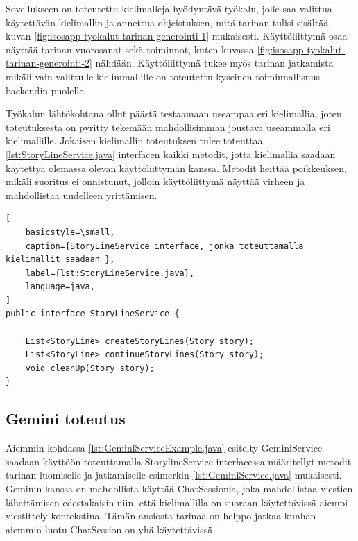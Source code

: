 Sovellukseen on toteutettu kielimalleja hyödyntävä työkalu, jolle saa valittua
käytettävän kielimallin ja annettua ohjeistuksen, mitä tarinan tulisi sisältää,
kuvan \ref{fig:isosapp-tyokalut-tarinan-generointi-1} mukaisesti.
Käyttöliittymä osaa näyttää tarinan vuorosanat sekä toiminnot, kuten kuvassa
\ref{fig:isosapp-tyokalut-tarinan-generointi-2} nähdään. Käyttöliittymä tukee
myös tarinan jatkamista mikäli vain valittulle kielimmallille on toteutettu
kyseinen toiminnallisuus backendin puolelle.

Työkalun lähtökohtana ollut päästä testaamaan useampaa eri kielimallia, joten
toteutuksesta on pyritty tekemään mahdollisimman joustava useammalla eri
kielimallille. Jokaisen kielimallin toteutuksen tulee toteuttaa
\ref{lst:StoryLineService.java} interfacen kaikki metodit, jotta kielimallia
saadaan käytettyä olemassa olevan käyttöliittymän kanssa. Metodit heittää
poikkeuksen, mikäli suoritus ei onnistunut, jolloin käyttöliittymä näyttää
virheen ja mahdollistaa uudelleen yrittämisen.

\clearpage
\begin{lstlisting}[
    basicstyle=\small,
    caption={StoryLineService interface, jonka toteuttamalla kielimallit saadaan },
    label={lst:StoryLineService.java},
    language=java,
]
public interface StoryLineService {

    List<StoryLine> createStoryLines(Story story);
    List<StoryLine> continueStoryLines(Story story);
    void cleanUp(Story story);
}
\end{lstlisting}

\subsection{Gemini toteutus}

Aiemmin kohdassa \ref{lst:GeminiServiceExample.java} esitelty GeminiService
saadaan käyttöön toteuttamalla StorylineService-interfacessa määritellyt
metodit tarinan luomiselle ja jatkamiselle esimerkin
\ref{lst:GeminiService.java} mukaisesti. Geminin kanssa on mahdollista käyttää
ChatSessionia, joka mahdollistaa viestien lähettämisen edestakaisin niin, että
kielimallilla on suoraan käytettävissä aiempi viestittely kontekstina. Tämän
ansiosta tarinaa on helppo jatkaa kunhan aiemmin luotu ChatSession on yhä
käytettävissä.

